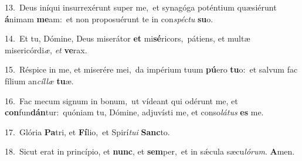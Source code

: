 {\numbfont\textcolor{\numbcolor}{13.}}~Deus iníqui insurrexérunt super me,~\dagger et synagóga poténtium quæsiérunt \textbf{á}\-nimam \textbf{me}\-am:~\star et non proposuérunt te in con\-\textit{spéc}\-\textit{tu} \textbf{su}\-o.\par
{\numbfont\textcolor{\numbcolor}{14.}}~Et tu, Dómine, Deus miserátor \textbf{et} mi\-\textbf{sé}\-ricors,~\star pátiens, et multæ misericórdi\-\textit{æ}\-, \textit{et} \textbf{ve}\-rax.\par
{\numbfont\textcolor{\numbcolor}{15.}}~Réspice in me, et miserére mei,~\dagger da impérium tuum \textbf{pú}\-ero \textbf{tu}\-o:~\star et salvum fac fílium an\-\textit{cíl}\-\textit{læ} \textbf{tu}\-æ.\par
{\numbfont\textcolor{\numbcolor}{16.}}~Fac mecum signum in bonum,~\dagger ut vídeant qui odérunt me, et \textbf{con}\-fun\-\textbf{dán}\-tur:~\star quóniam tu, Dómine, adjuvísti me, et conso\-\textit{lá}\-\textit{tus} \textbf{es} me.\par
{\numbfont\textcolor{\numbcolor}{17.}}~Glória \textbf{Pa}\-tri, et \textbf{Fí}\-lio,~\star et Spirí\-\textit{tu}\-\textit{i} \textbf{Sanc}\-to.\par
{\numbfont\textcolor{\numbcolor}{18.}}~Sicut erat in princípio, et \textbf{nunc}\-, et \textbf{sem}\-per,~\star et in sǽcula sæcu\-\textit{ló}\-\textit{rum}. \textbf{A}\-men.\par
